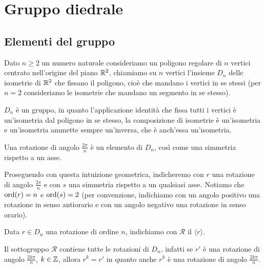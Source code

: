 \documentclass[11pt]{scrartcl}
\begin{document}
\newpage

\section{Gruppo diedrale}

\subsection{Elementi del gruppo}

\begin{definition}
    Dato $n \geqslant 2$ un numero naturale consideriamo un poligono regolare di $n$ vertici
    centrato nell'origine del piano $\mathbb R^2$,
    chiamiamo  su $n$ vertici l'insieme $D_n$
    delle isometrie di $\mathbb R^2$ che fissano il poligono, cioè che mandano i 
    vertici in se stessi (per $n = 2$ consideriamo le isometrie che mandano un 
    segmento in se stesso).
\end{definition}

\begin{remark}
    $D_n$ è un gruppo, in quanto l'applicazione identità che 
    fissa tutti i vertici è un'isometria dal poligono in se stesso, la 
    composizione di isometrie è un'isometria e un'isometria ammette sempre 
    un'inversa, che è anch'essa un'isometria.
\end{remark}

\begin{remark}
    Una rotazione di angolo $\displaystyle\frac{2\pi}{n}$ è un elemento di $D_n$,
    così come una simmetria rispetto a un asse.
\end{remark}

Proseguendo con questa intuizione geometrica, indicheremo con $r$ una rotazione
di angolo $\displaystyle \frac{2\pi}{n}$ e con $s$ una simmetria rispetto a
un qualsiasi asse. Notiamo che $\operatorname{ord}(r) = n$ e $\operatorname{ord}(s) = 2$ (per convenzione, 
indichiamo con un angolo positivo una rotazione in senso antiorario e con un 
angolo negativo una rotazione in senso orario).

\begin{definition}
    Data $r \in D_n$ una rotazione di ordine $n$, indichiamo con $\mathcal{R}$ il
     $\langle r\rangle$.
\end{definition}

\begin{remark}
    Il sottogruppo $\mathcal{R}$ contiene tutte le rotazioni di $D_n$, infatti
    se $r'$ è una rotazione di angolo $\displaystyle\frac{2k\pi}{n}$, $k \in \mathbb Z$,
    allora $r^k = r'$ in quanto anche $r^k$ è una rotazione di angolo 
    $\displaystyle\frac{2k\pi}{n}$.
\end{remark}
\end{document}
